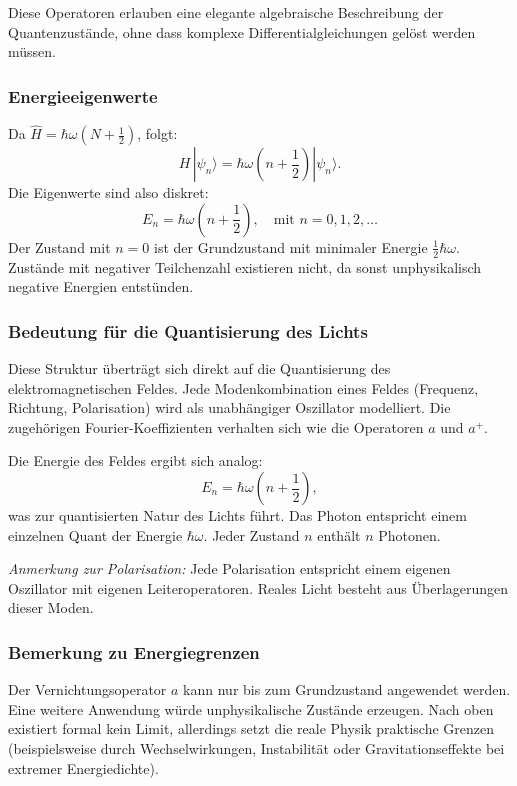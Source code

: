 			Diese Operatoren erlauben eine elegante algebraische Beschreibung der Quantenzustände, ohne dass komplexe Differentialgleichungen gelöst werden müssen.

		\subsubsection{Energieeigenwerte\label{fourier:subsubsection:Energieeigenwerte}}
			Da $\hat{H} = \hbar\omega(N + \frac{1}{2})$, folgt:
			\begin{equation}
				H\,|\psi_n\rangle = \hbar\omega\left(n + \frac{1}{2}\right) |\psi_n\rangle.
			\end{equation}
			Die Eigenwerte sind also diskret:
			\[
				E_n = \hbar\omega\left(n + \frac{1}{2}\right), \quad \text{mit } n = 0,1,2,\dots
			\]
			Der Zustand mit $n = 0$ ist der Grundzustand mit minimaler Energie $\frac{1}{2}\hbar\omega$.
			Zustände mit negativer Teilchenzahl existieren nicht, da sonst unphysikalisch negative Energien entstünden.

		\subsubsection{Bedeutung für die Quantisierung des Lichts\label{fourier:subsubsection:QuantisierungElmagFeld}}
			Diese Struktur überträgt sich direkt auf die Quantisierung des elektromagnetischen Feldes.
			Jede Modenkombination eines Feldes (Frequenz, Richtung, Polarisation) wird als unabhängiger Oszillator modelliert.
			Die zugehörigen Fourier-Koeffizienten verhalten sich wie die Operatoren $a$ und $a^+$.

			Die Energie des Feldes ergibt sich analog:
			\[
				E_n = \hbar\omega\left(n + \frac{1}{2}\right),
			\]
			was zur quantisierten Natur des Lichts  führt.
			Das Photon entspricht einem einzelnen Quant der Energie $\hbar\omega$.
			Jeder Zustand $n$ enthält $n$ Photonen.
			
			\textit{Anmerkung zur Polarisation:}
			Jede Polarisation entspricht einem eigenen Oszillator mit eigenen Leiteroperatoren.
			Reales Licht besteht aus Überlagerungen dieser Moden.

		\subsubsection{Bemerkung zu Energiegrenzen\label{fourier:subsubsection:BemerkungBegrenztheitDerEnergie}}
			Der Vernichtungsoperator $a$ kann nur bis zum Grundzustand angewendet werden.
			Eine weitere Anwendung würde unphysikalische Zustände erzeugen.
			Nach oben existiert formal kein Limit, allerdings setzt die reale Physik praktische Grenzen (beispielsweise durch Wechselwirkungen, Instabilität oder Gravitationseffekte bei extremer Energiedichte).

